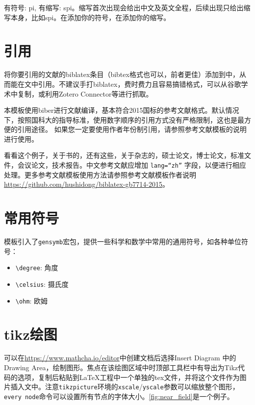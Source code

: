 有符号: \gls{pi}, 有缩写: \gls{spi}。缩写首次出现会给出中文及英文全程，后续出现只给出缩写本身，比如\gls{spi}。在添加你的符号，在添加你的缩写。

\section{引用}

将你要引用的文献的biblatex条目（bibtex格式也可以，前者更佳）添加到中，从而能在文中引用。不建议手打biblatex，费时费力且容易搞错格式，可以从谷歌学术中复制，或利用Zotero Connector等进行抓取。

本模板使用biber进行文献编译，基本符合2015国标的参考文献格式。默认情况下，按照国科大的指导标准，使用数字顺序的引用方式没有严格限制，这也是最方便的引用途径。 如果您一定要使用作者年份制引用，请参照参考文献模板的说明进行使用。

看看这个例子，关于书的\cite{tex, companion, ColdSources}，还有这些\cite{Krasnogor2004e, clzs,zjsw}，关于杂志的\cite{ELIDRISSI94, MELLINGER96, SHELL02}，硕士论文\cite{zhubajie, metamori2004}，博士论文\cite{shaheshang, FistSystem01}，标准文件\cite{IEEE-1363}，会议论文\cite{DPMG,kocher99}，技术报告\cite{NPB2}。中文参考文献\cite{cnarticle}应增加 \texttt{lang=``zh''} 字段，以便进行相应处理。更多参考文献模板使用方法请参照参考文献模板作者说明\url{https://github.com/hushidong/biblatex-gb7714-2015}。

\section{常用符号}
模板引入了\texttt{gensymb}宏包，提供一些科学和数学中常用的通用符号，如各种单位符号：
\begin{itemize}
    \item \verb|\degree|: 角度\degree
    \item \verb|\celsius|: 摄氏度\celsius
    \item \verb|\ohm|: 欧姆\ohm
\end{itemize}

\section{tikz绘图}

可以在\url{https://www.mathcha.io/editor}中创建文档后选择Insert Diagram 中的Drawing Area，绘制图形。焦点在该绘图区域中时顶部工具栏中有导出为Tikz代码的选项，复制后粘贴到\LaTeX 工程中一个单独的tex文件，并将这个文件作为图片插入文中。注意\texttt{tikzpicture}环境的\texttt{xscale}/\texttt{yscale}参数可以缩放整个图形，\texttt{every node}命令可以设置所有节点的字体大小。\autoref{fig:near_field}是一个例子。

